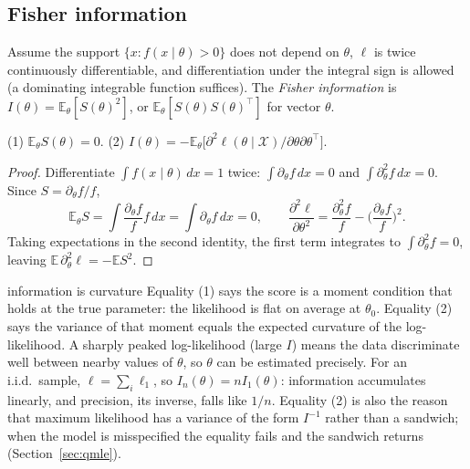 \documentclass[11pt,a4paper]{article}
\newcommand{\E}{\mathbb{E}}
\newcommand{\iid}{i.i.d.}
\begin{document}
\subsection{Fisher information}

Assume the support $\{x:f(x\mid\theta)>0\}$ does not depend on $\theta$, $\ell$ is twice continuously differentiable, and differentiation under the integral sign is allowed (a dominating integrable function suffices). The \emph{Fisher information} is $I(\theta)=\E_\theta[S(\theta)^2]$, or $\E_\theta[S(\theta)S(\theta)^\top]$ for vector $\theta$.

\begin{theorem}\label{thm:infoeq}
\textup{(1)} $\E_\theta S(\theta)=0$. \textup{(2)} $I(\theta)=-\E_\theta\big[\partial^2\ell(\theta\mid\mathcal X)/\partial\theta\partial\theta^\top\big]$.
\end{theorem}

\begin{proof}
Differentiate $\int f(x\mid\theta)\,dx=1$ twice: $\int\partial_\theta f\,dx=0$ and $\int\partial^2_\theta f\,dx=0$. Since $S=\partial_\theta f/f$,
\[
\E_\theta S=\int\frac{\partial_\theta f}{f}f\,dx=\int\partial_\theta f\,dx=0,\qquad
\frac{\partial^2\ell}{\partial\theta^2}=\frac{\partial^2_\theta f}{f}-\Big(\frac{\partial_\theta f}{f}\Big)^2 .
\]
Taking expectations in the second identity, the first term integrates to $\int\partial_\theta^2f=0$, leaving $\E\,\partial^2_\theta\ell=-\E S^2$.
\end{proof}

\begin{whybox}{information is curvature}
Equality (1) says the score is a moment condition that holds at the true parameter: the likelihood is flat on average at $\theta_0$. Equality (2) says the variance of that moment equals the expected curvature of the log-likelihood. A sharply peaked log-likelihood (large $I$) means the data discriminate well between nearby values of $\theta$, so $\theta$ can be estimated precisely. For an \iid\ sample, $\ell=\sum_i\ell_1$, so $I_n(\theta)=nI_1(\theta)$: information accumulates linearly, and precision, its inverse, falls like $1/n$. Equality (2) is also the reason that maximum likelihood has a variance of the form $I^{-1}$ rather than a sandwich; when the model is misspecified the equality fails and the sandwich returns (Section~\ref{sec:qmle}).
\end{whybox}
\end{document}
